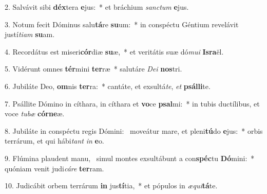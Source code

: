 2. Salvávit sibi \textbf{déx}tera \textbf{e}jus:~*  et bráchium \textit{sanc}\textit{tum} \textbf{e}jus.\

3. Notum fecit Dóminus salu\textbf{tá}re \textbf{su}um:~*  in conspéctu Géntium revelávit justí\textit{ti}\textit{am} \textbf{su}am.\

4. Recordátus est miseri\textbf{cór}diæ \textbf{su}æ,~*  et veritátis suæ dó\textit{mu}\textit{i} \textbf{Is}\textbf{ra}ël.\

5. Vidérunt omnes \textbf{tér}mini \textbf{ter}ræ~*  salutáre \textit{De}\textit{i} \textbf{nos}tri.\

6. Jubiláte Deo, \textbf{om}nis \textbf{ter}ra:~*  cantáte, et exsultá\textit{te}, \textit{et} \textbf{psál}\textbf{li}te.\

7. Psállite Dómino in cíthara, in cíthara et \textbf{vo}ce \textbf{psal}mi:~*  in tubis ductílibus, et voce \textit{tu}\textit{bæ} \textbf{cór}\textbf{ne}æ.\

8. Jubiláte in conspéctu regis Dómini: \dag\  moveátur mare, et pleni\textbf{tú}do \textbf{e}jus:~*  orbis terrárum, et qui hábi\textit{tant} \textit{in} \textbf{e}o.\

9. Flúmina plaudent manu, \dag\  simul montes exsultábunt a con\textbf{spéc}tu \textbf{Dó}mini:~*  quóniam venit judi\textit{cá}\textit{re} \textbf{ter}ram.\

10. Judicábit orbem terrárum \textbf{in} jus\textbf{tí}tia,~*  et pópulos in \textit{æ}\textit{qui}\textbf{tá}te.\

